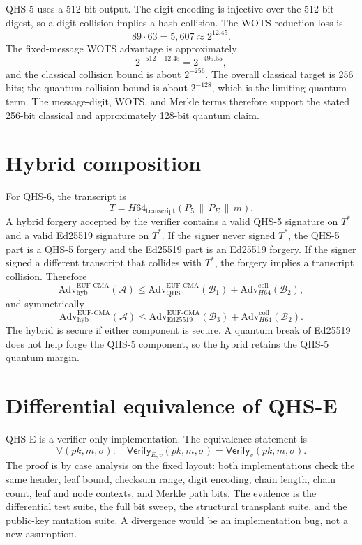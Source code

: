 \documentclass[11pt,a4paper]{article}
\theoremstyle{remark}
\newcommand{\Adv}{\mathrm{Adv}}
\newcommand{\EUF}{\mathrm{EUF\text{-}CMA}}
\newcommand{\coll}{\mathrm{coll}}
\newcommand{\Ver}{\mathsf{Verify}}
\newcommand{\concat}{\,\|\,}
\begin{document}
QHS-5 uses a 512-bit output. The digit encoding is injective over the 512-bit
digest, so a digit collision implies a hash collision. The WOTS reduction loss
is
\[
89\cdot 63=5{,}607\approx 2^{12.45}.
\]
The fixed-message WOTS advantage is approximately
\[
2^{-512+12.45}=2^{-499.55},
\]
and the classical collision bound is about \(2^{-256}\). The overall classical
target is 256 bits; the quantum collision bound is about \(2^{-128}\), which is
the limiting quantum term. The message-digit, WOTS, and Merkle terms therefore
support the stated 256-bit classical and approximately 128-bit quantum claim.

\section{Hybrid composition}

For QHS-6, the transcript is
\[
T=H64_{\text{transcript}}(P_5\concat P_E\concat m).
\]
A hybrid forgery accepted by the verifier contains a valid QHS-5 signature on
\(T^*\) and a valid Ed25519 signature on \(T^*\). If the signer never signed
\(T^*\), the QHS-5 part is a QHS-5 forgery and the Ed25519 part is an Ed25519
forgery. If the signer signed a different transcript that collides with
\(T^*\), the forgery implies a transcript collision. Therefore
\[
\Adv^{\EUF}_{\mathrm{hyb}}(\mathcal{A})
\le
\Adv^{\EUF}_{\mathrm{QHS5}}(\mathcal{B}_1)
+
\Adv^{\coll}_{H64}(\mathcal{B}_2),
\]
and symmetrically
\[
\Adv^{\EUF}_{\mathrm{hyb}}(\mathcal{A})
\le
\Adv^{\EUF}_{\mathrm{Ed25519}}(\mathcal{B}_3)
+
\Adv^{\coll}_{H64}(\mathcal{B}_2).
\]
The hybrid is secure if either component is secure. A quantum break of Ed25519
does not help forge the QHS-5 component, so the hybrid retains the QHS-5 quantum
margin.

\section{Differential equivalence of QHS-E}

QHS-E is a verifier-only implementation. The equivalence statement is
\[
\forall (pk,m,\sigma):\quad
\Ver_{E,v}(pk,m,\sigma)=\Ver_{v}(pk,m,\sigma).
\]
The proof is by case analysis on the fixed layout: both implementations check
the same header, leaf bound, checksum range, digit encoding, chain length, chain
count, leaf and node contexts, and Merkle path bits. The evidence is the
differential test suite, the full bit sweep, the structural transplant suite,
and the public-key mutation suite. A divergence would be an implementation bug,
not a new assumption.
\end{document}
